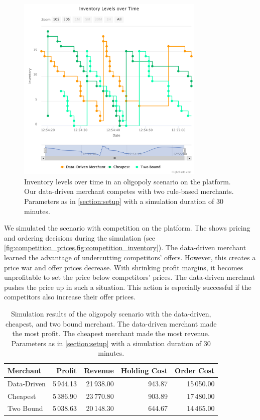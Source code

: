 \begin{figure}[t]
	\centering
	\includegraphics[width=0.8\textwidth]{figures/competition_inventory.pdf}
	\caption[Inventory Levels in Oligopoly Scenario]{Inventory levels over time in an oligopoly scenario on the \pricewars platform. Our data-driven merchant competes with two rule-based merchants. Parameters as in \cref{section:setup} with a simulation duration of 30 minutes.}
	\label{fig:competition_inventory}
\end{figure}

We simulated the scenario with competition on the \pricewars platform.
The \ui shows pricing and ordering decisions during the simulation (see \cref{fig:competition_prices,fig:competition_inventory}).
The data-driven merchant learned the advantage of undercutting competitors' offers.
However, this creates a price war and offer prices decrease.
With shrinking profit margins, it becomes unprofitable to set the price below competitors' prices.
The data-driven merchant pushes the price up in such a situation.
This action is especially successful if the competitors also increase their offer prices.

\begin{table}[t]
	\centering
	\begin{tabular}{lrrrr}
		\toprule
		\textbf{Merchant} & \textbf{Profit} & \textbf{Revenue} & \textbf{Holding Cost} & \textbf{Order Cost} \\
		\midrule
		Data-Driven & 5\,944.13 & 21\,938.00 & 943.87 & 15\,050.00 \\
		Cheapest & 5\,386.90 & 23\,770.80 & 903.89 & 17\,480.00 \\
		Two Bound & 5\,038.63 & 20\,148.30 & 644.67 & 14\,465.00 \\
		\bottomrule
	\end{tabular}
	\caption[Simulation Results of Oligopoly Scenario]{Simulation results of the oligopoly scenario with the data-driven, cheapest, and two bound merchant. The data-driven merchant made the most profit. The cheapest merchant made the most revenue. Parameters as in \cref{section:setup} with a simulation duration of 30 minutes.}
	\label{tab:competition}
\end{table}

